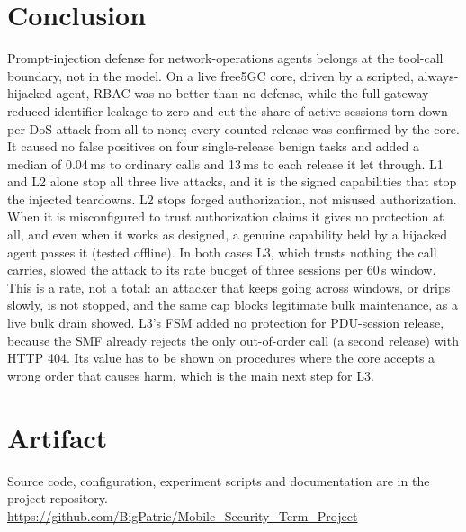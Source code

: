 \documentclass[conference]{IEEEtran}
\begin{document}
\section{Conclusion}

Prompt-injection defense for network-operations agents belongs at the tool-call boundary,
not in the model. On a live free5GC core, driven by a scripted, always-hijacked agent, RBAC was
no better than no defense, while the full gateway reduced identifier leakage to zero and cut the
share of active sessions torn down per DoS attack from all to none; every counted release was
confirmed by the core. It caused no false positives on four single-release benign tasks and
added a median of 0.04\,ms to ordinary calls and 13\,ms to each release it let through.
L1 and L2 alone stop all three live attacks, and it is the signed capabilities that stop the
injected teardowns. L2 stops forged authorization, not misused authorization. When it is misconfigured to
trust authorization claims it gives no protection at all, and even when it works as designed, a
genuine capability held by a hijacked agent passes it (tested offline).
In both cases L3, which trusts nothing the call carries, slowed the attack to its rate budget of
three sessions per 60\,s window. This is a rate, not a total: an attacker that keeps going across
windows, or drips slowly, is not stopped, and the same cap blocks legitimate bulk maintenance, as
a live bulk drain showed. L3's FSM added no protection for PDU-session release, because the SMF
already rejects the only out-of-order call (a second release) with HTTP 404. Its value has to be
shown on procedures where the core accepts a wrong order that causes harm, which is the main
next step for L3.

\section*{Artifact}
{\raggedright
Source code, configuration, experiment scripts and documentation are in the project
repository.
\url{https://github.com/BigPatric/Mobile_Security_Term_Project}\par}




\end{document}
